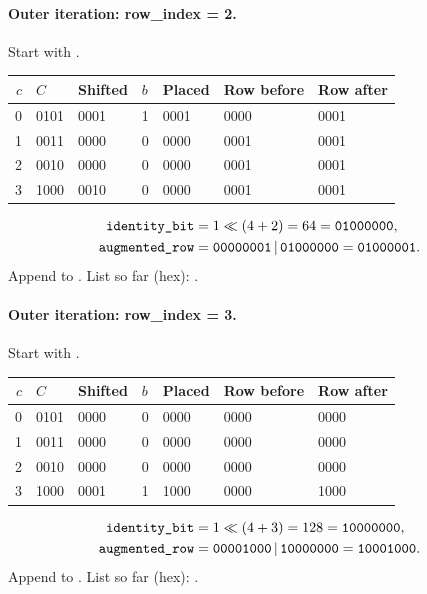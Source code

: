 \paragraph{Outer iteration: row\_index = 2.}
Start with .
\begin{center}\small\begin{tabular}{rllllll}\toprule
$c$ & $C$ & Shifted & $b$ & Placed & Row before & Row after\\\midrule
0 & 0101 & 0001 & 1 & 0001 & 0000 & 0001\\
1 & 0011 & 0000 & 0 & 0000 & 0001 & 0001\\
2 & 0010 & 0000 & 0 & 0000 & 0001 & 0001\\
3 & 1000 & 0010 & 0 & 0000 & 0001 & 0001\\
\bottomrule\end{tabular}\end{center}
\[\begin{aligned}
\texttt{identity\_bit}&=1\ll(4+2)=64=\texttt{01000000},\\
\texttt{augmented\_row}&=\texttt{00000001}\,|\,\texttt{01000000}=\texttt{01000001}.\end{aligned}\]
Append to . List so far (hex): .
\paragraph{Outer iteration: row\_index = 3.}
Start with .
\begin{center}\small\begin{tabular}{rllllll}\toprule
$c$ & $C$ & Shifted & $b$ & Placed & Row before & Row after\\\midrule
0 & 0101 & 0000 & 0 & 0000 & 0000 & 0000\\
1 & 0011 & 0000 & 0 & 0000 & 0000 & 0000\\
2 & 0010 & 0000 & 0 & 0000 & 0000 & 0000\\
3 & 1000 & 0001 & 1 & 1000 & 0000 & 1000\\
\bottomrule\end{tabular}\end{center}
\[\begin{aligned}
\texttt{identity\_bit}&=1\ll(4+3)=128=\texttt{10000000},\\
\texttt{augmented\_row}&=\texttt{00001000}\,|\,\texttt{10000000}=\texttt{10001000}.\end{aligned}\]
Append to . List so far (hex): .
